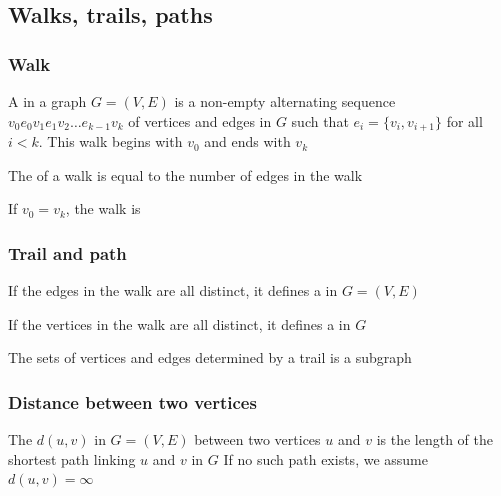 \documentclass[aspectratio=43]{beamer}
\begin{document}



\subsection{Walks, trails, paths}


\begin{frame}\frametitle{Walk}
\begin{definition}[{Walk}]
A  in a graph $G=(V,E)$ is a non-empty alternating sequence $v_0 e_0 v_1 e_1 v_2 \dots e_{k-1} v_k$ of vertices and edges in $G$ such that $e_i=\{v_i, v_{i+1}\}$ for all $i<k$. 
This walk begins with $v_0$ and ends with $v_k$
\end{definition}
\vfill
\begin{definition}
The  of a walk is equal to the number of edges in the walk
\end{definition}
\vfill
\begin{definition}
If $v_0=v_k$, the walk is 
\end{definition}
\end{frame}


\begin{frame}\frametitle{Trail and path}
\begin{definition}[{Trail}]
If the edges in the walk are all distinct, it defines a  in $G=(V,E)$
\end{definition}
\vfill
\begin{definition}[{Path}]
If the vertices in the walk are all distinct, it defines a  in $G$
\end{definition}
\vfill
The sets of vertices and edges determined by a trail is a subgraph
\end{frame}


\begin{frame}\frametitle{Distance between two vertices}
\begin{definition}
The  $d(u,v)$ in $G=(V,E)$ between two vertices $u$ and $v$ is the length of the shortest path linking $u$ and $v$ in $G$
\vskip0.2cm
If no such path exists, we assume $d(u,v)=\infty$
\end{definition}
\end{frame}
\end{document}
